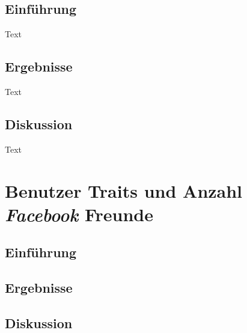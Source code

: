 \subsection{Einführung}\label{subsec.amountEinführung}
Text

\subsection{Ergebnisse}\label{subsec.amontErgebnisse}
Text

\subsection{Diskussion}\label{subsec.amountDiskussion}
Text

\section{Benutzer Traits und Anzahl \textit{Facebook} Freunde}\label{sub.traits}

\subsection{Einführung}\label{subsec.traitsEinführung}

\subsection{Ergebnisse}\label{subsec.traitsErgebnisse}

\subsection{Diskussion}\label{subsec.traitsDiskussion}


